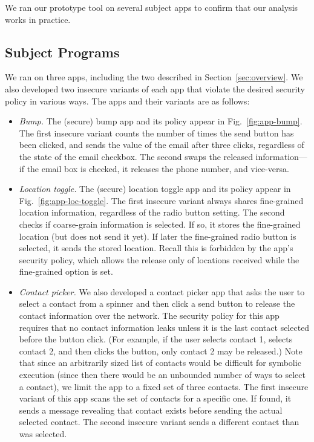 \documentclass[10pt,conference,compsocconf]{IEEEtran}
\begin{document}
We ran our prototype tool on several subject apps to confirm that our
analysis works in practice.

\subsection{Subject Programs} We ran on three apps, including the two
described in Section~\ref{sec:overview}. We also developed two
insecure variants of each app that violate the
desired security policy in various ways. The apps and their variants
are as follows:

\begin{itemize}
\item \textit{Bump.} The (secure) bump app and its policy appear in
  Fig.~\ref{fig:app-bump}. The first insecure variant counts the number of
  times the send button has been clicked, and sends the value of the
  email after three clicks, regardless of the state of the email
  checkbox. The second swaps the released information---if the email
  box is checked, it releases the phone number, and vice-versa.

\item \textit{Location toggle.} The (secure) location toggle app and
  its policy appear in Fig.~\ref{fig:app-loc-toggle}. The first insecure
  variant always shares fine-grained location information, regardless
  of the radio button setting. The second checks if coarse-grain
  information is selected. If so, it stores the fine-grained location
  (but does not send it yet).  If later the fine-grained radio button
  is selected, it sends the stored location. Recall this is forbidden
  by the app's security policy, which allows the release only of locations
  received while the fine-grained option is set.

\item \textit{Contact picker.} We also developed a contact picker app
  that asks the user to select a contact from a spinner and then
  click a send button to release the contact information over the
  network. The security policy for this app requires that no contact
  information leaks unless it is the last contact selected before the
  button click. (For example, if the user selects contact 1,
  selects contact 2, and then clicks the button, only contact 2 may be
  released.) Note that since an arbitrarily sized list of contacts
  would be difficult for symbolic execution (since then there would be
  an unbounded number of ways to select a contact), we limit the app
  to a fixed set of three contacts.
  The first insecure variant of this app scans the set of contacts for a
  specific one. If found, it sends a message revealing that contact
  exists before sending the actual selected contact. The second insecure
  variant sends a different contact than was selected.
\end{itemize}
\end{document}
